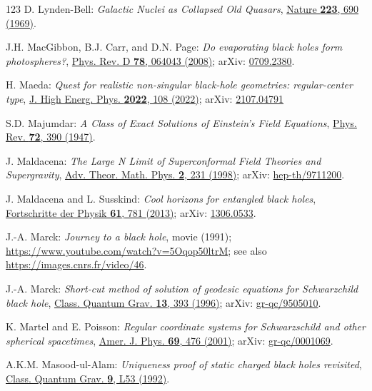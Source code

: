 \begin{thebibliography}{123}
D. Lynden-Bell:
{\em Galactic Nuclei as Collapsed Old Quasars},
\href{https://doi.org/10.1038/223690a0}{Nature {\bf 223}, 690 (1969)}.

J.H. MacGibbon, B.J. Carr, and D.N. Page:
{\em Do evaporating black holes form photospheres?},
\href{https://doi.org/10.1103/PhysRevD.78.064043}{Phys. Rev. D {\bf 78}, 064043 (2008)};
arXiv: \href{https://arxiv.org/abs/0709.2380}{0709.2380}.

H. Maeda:
{\em Quest for realistic non-singular black-hole geometries: regular-center type},
\href{https://doi.org/10.1007/JHEP11(2022)108}{J. High Energ. Phys. {\bf 2022}, 108 (2022)};
arXiv: \href{https://arxiv.org/abs/2107.04791}{2107.04791}

S.D. Majumdar:
{\em A Class of Exact Solutions of Einstein's Field Equations},
\href{https://doi.org/10.1103/PhysRev.72.390}{Phys. Rev. {\bf 72}, 390 (1947)}.

J. Maldacena:
{\em The Large N Limit of Superconformal Field Theories and Supergravity},
\href{https://doi.org/10.4310/ATMP.1998.v2.n2.a1}{Adv. Theor. Math. Phys. {\bf 2}, 231 (1998)};
arXiv: \href{https://arxiv.org/abs/hep-th/9711200}{hep-th/9711200}.

J. Maldacena and L. Susskind:
{\em Cool horizons for entangled black holes},
\href{https://doi.org/10.1002/prop.201300020}{Fortschritte der Physik {\bf 61}, 781 (2013)};
arXiv: \href{https://arxiv.org/abs/1306.0533}{1306.0533}.

J.-A. Marck:
{\em Journey to a black hole}, movie (1991);
\url{https://www.youtube.com/watch?v=5Oqop50ltrM};
see also \url{https://images.cnrs.fr/video/46}.

J.-A. Marck:
{\em Short-cut method of solution of geodesic equations for Schwarzchild black hole},
\href{https://doi.org/10.1088/0264-9381/13/3/007}{Class. Quantum Grav. {\bf 13}, 393 (1996)};
arXiv: \href{https://arxiv.org/abs/gr-qc/9505010}{gr-qc/9505010}.

K. Martel and E. Poisson:
{\em Regular coordinate systems for Schwarzschild and other spherical spacetimes},
\href{https://doi.org/10.1119/1.1336836}{Amer. J. Phys. {\bf 69}, 476 (2001)};
arXiv: \href{https://arxiv.org/abs/gr-qc/0001069}{gr-qc/0001069}.

A.K.M. Masood-ul-Alam:
{\em Uniqueness proof of static charged black holes revisited},
\href{https://doi.org/10.1088/0264-9381/9/5/001}{Class. Quantum Grav. {\bf 9}, L53 (1992)}.


\end{thebibliography}
